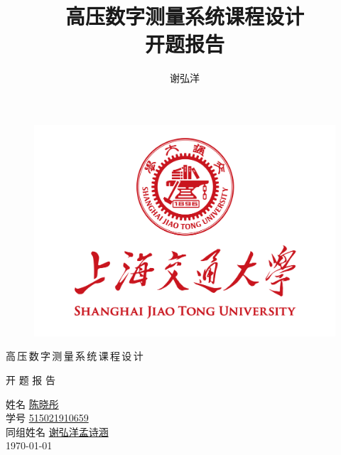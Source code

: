 \documentclass[a4paper,11pt]{ctexart}
\title
{
	\linespread{1.5} \zihao{4}
	高压数字测量系统课程设计 \\ 
	\zihao{2}
	开题报告
}
\author
{
	谢弘洋
}
\date{}
\newcommand{\AuthorC}
{
	
	\zihao{-3}
	\hspace{2em}姓名\hspace{1em} \underline{\hspace{4em}陈晓彤\hspace{4em}}\\
	\vspace{1em}
	\hspace{2em}学号\hspace{1em} \underline{\hspace{2.5em}515021910659\hspace{2.5em}}\\
	\vspace{1em}
	同组姓名\hspace{1em} \underline{\hspace{2em}谢弘洋\hspace{1em}孟诗涵\hspace{2em}}\\
}
\begin{document}
	\pagestyle{plain}

\begin{figure}[t]
	\setlength{\abovecaptionskip}{-10mm}
	\setlength{\belowcaptionskip}{-60mm}
	\centering
	\includegraphics[scale=0.4]{page1.png}
\end{figure}

\begin{center}
	高\,压\,数\,字\,测\,量\,系\,统\,课\,程\,设\,计 \\
	\vspace{0.7em}
	
	开\hspace{0.5em} 题\hspace{0.5em} 报\hspace{0.5em} 告\\
	\vspace{3em}
		
	\AuthorC
	
	\vspace{6em}
	\today
\end{center}
\end{document}
